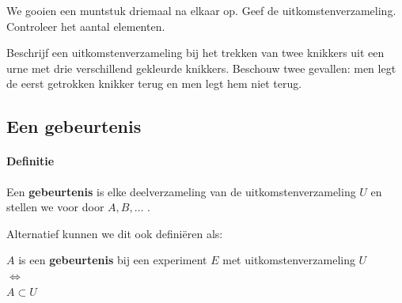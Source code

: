 \documentclass[12pt,twoside]{article}
\begin{document}
\begin{oefening}
We gooien een muntstuk driemaal na elkaar op. Geef de uitkomstenverzameling. Controleer het aantal elementen.
\end{oefening}

\begin{oefening}
Beschrijf een uitkomstenverzameling bij het trekken van twee knikkers uit een urne met drie verschillend gekleurde knikkers. Beschouw twee gevallen: men legt de eerst getrokken knikker terug en men legt hem niet terug.
\end{oefening}

\pagebreak

\subsection{Een gebeurtenis}

\paragraph*{Definitie} Een {\bf gebeurtenis} is elke deelverzameling van de uitkomstenverzameling $U$ en stellen
we voor door $A, B, \ldots$ .

Alternatief kunnen we dit ook definiëren als:\\
\begin{mdframed}
\begin{center}
$A$ is een {\bf gebeurtenis} bij een experiment $E$ met uitkomstenverzameling $U$\\
$\Leftrightarrow$\\
$A\subset U$
\end{center}
\end{mdframed}
\end{document}
